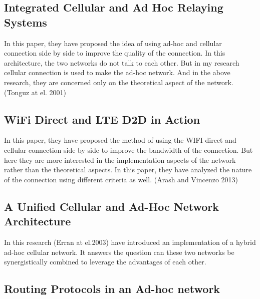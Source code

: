 \subsection{Integrated Cellular and Ad Hoc Relaying Systems}

\vspace{12pt}
In this paper, they have proposed the idea of using ad-hoc and cellular connection side by side to improve the quality of the connection. In this architecture, the two networks do not talk to each other. But in my research cellular connection is used to make the ad-hoc network. And in the above research, they are concerned only on the theoretical aspect of the network. (Tonguz at el. 2001)\cite{iCAR}

\vspace{12pt}

\subsection{WiFi Direct and LTE D2D in Action}

\vspace{12pt}
In this paper, they have proposed the method of using the WIFI  direct and cellular connection side by side to improve the bandwidth of the connection. But here they are more interested in the implementation aspects of the network rather than the theoretical aspects. In this paper, they have analyzed the nature of the connection using different criteria as well. (Arash and Vincenzo 2013)\cite{wifi_direct_lte}

\vspace{12pt}

\subsection{A Unified Cellular and Ad-Hoc Network Architecture}


\vspace{12pt}
In this research (Erran at el.2003)\cite{UCAN} have introduced an implementation of a hybrid ad-hoc cellular network. It answers the question can these two networks be synergistically combined to leverage the advantages of each other. 

\vspace{12pt}



\subsection{Routing Protocols in an Ad-hoc network}

